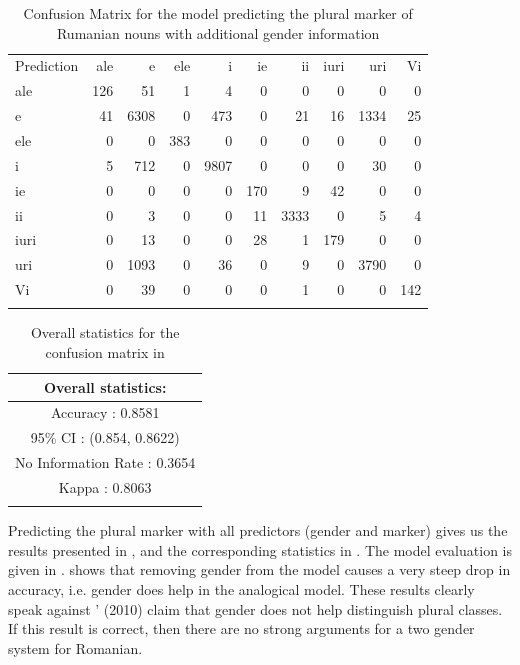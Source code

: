 \begin{table}
  \centering
  \begin{tabular}{lrrrrrrrrr}
    \lsptoprule
    \multicolumn{10}{c}{Reference}                                        \\
    \midrule
    Prediction & ale & e    & ele & i    & ie  & ii   & iuri & uri  & Vi  \\
    ale        & 126 & 51   & 1   & 4    & 0   & 0    & 0    & 0    & 0   \\
    e          & 41  & 6308 & 0   & 473  & 0   & 21   & 16   & 1334 & 25  \\
    ele        & 0   & 0    & 383 & 0    & 0   & 0    & 0    & 0    & 0   \\
    i          & 5   & 712  & 0   & 9807 & 0   & 0    & 0    & 30   & 0   \\
    ie         & 0   & 0    & 0   & 0    & 170 & 9    & 42   & 0    & 0   \\
    ii         & 0   & 3    & 0   & 0    & 11  & 3333 & 0    & 5    & 4   \\
    iuri       & 0   & 13   & 0   & 0    & 28  & 1    & 179  & 0    & 0   \\
    uri        & 0   & 1093 & 0   & 36   & 0   & 9    & 0    & 3790 & 0   \\
    Vi         & 0   & 39   & 0   & 0    & 0   & 1    & 0    & 0    & 142 \\
    \lspbottomrule
  \end{tabular}
  \caption{Confusion Matrix for the model predicting the plural marker of Rumanian nouns with additional gender information}
  \label{tab:plural-romanian-2}
\end{table}

\begin{table}
  \centering
  \begin{tabular}{c}
    \lsptoprule
    Overall statistics: \\
    \midrule
    Accuracy : 0.8581\\
    95\% CI : (0.854, 0.8622)\\
    No Information Rate : 0.3654\\
    Kappa : 0.8063\\
    \lspbottomrule
  \end{tabular}
  \caption{Overall statistics for the confusion matrix in }\label{tab:plural-romanian-stats-2}
\end{table}

Predicting the plural marker with all predictors (gender and  marker) gives us the results presented in , and the corresponding statistics in . The model evaluation is given in .  shows that removing gender from the model causes a very steep drop in accuracy, i.e. gender does help in the analogical model. These results clearly speak against \citeauthor{Bateman.2010}' (2010) claim that gender does not help distinguish plural classes. If this result is correct, then there are no strong arguments for a two gender system for Romanian.


